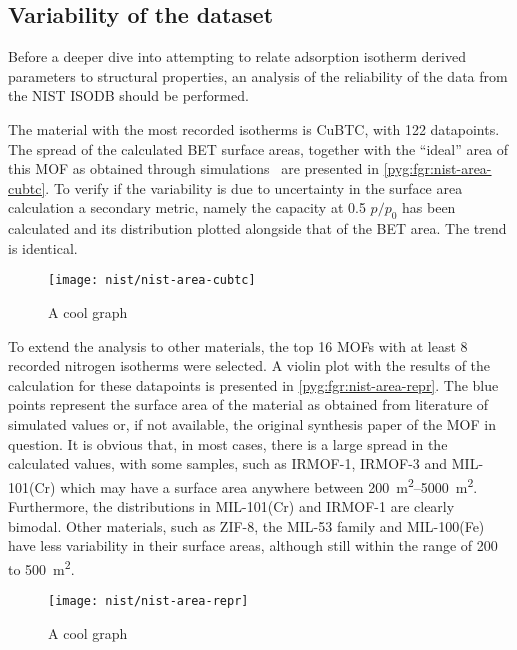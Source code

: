 \subsection{Variability of the dataset}

Before a deeper dive into attempting to relate adsorption isotherm
derived parameters to structural properties, an analysis of the 
reliability of the data from the NIST ISODB should be performed.

The material with the most recorded isotherms is CuBTC, with 
122 datapoints. The spread of the calculated BET surface areas,
together with the ``ideal'' area of this MOF as obtained
through simulations~\cite{parkHowReproducibleAre2017} are 
presented in \autoref{pyg:fgr:nist-area-cubtc}.
To verify if the variability is due to uncertainty in the 
surface area calculation a secondary metric, namely the 
capacity at 0.5 \(p/p_0\) has been calculated and its 
distribution plotted alongside that of the BET area. The
trend is identical.

\begin{wrapfigure}{h}{0.5\textwidth}
    \centering

    \texttt{[image: nist/nist-area-cubtc]}%
    \caption{A cool graph}%
    \label{pyg:fgr:nist-area-cubtc}
\end{wrapfigure}

To extend the analysis to other materials, the top 16 MOFs with 
at least 8 recorded nitrogen isotherms were selected. A 
violin plot with the results of the calculation for 
these datapoints is presented in \autoref{pyg:fgr:nist-area-repr}.
The blue points represent the surface area of the material as
obtained from literature of simulated values or, if not available,
the original synthesis paper of the MOF in question.
It is obvious that, in most cases, there is a large spread in
the calculated values, with some samples, such as IRMOF-1,
IRMOF-3 and MIL-101(Cr) which may have a surface area anywhere
between \SIrange{200}{5000}{\metre^2}. Furthermore, the
distributions in MIL-101(Cr) and IRMOF-1 are clearly 
bimodal. Other materials, such as ZIF-8, the MIL-53 family
and MIL-100(Fe) have less variability in their surface areas,
although still within the range of 200 to \SI{500}{\metre^2}.

\begin{figure}[tb]
    \centering
    \texttt{[image: nist/nist-area-repr]}%
    \caption{A cool graph}%
    \label{pyg:fgr:nist-area-repr}
\end{figure}

